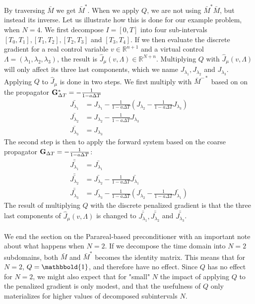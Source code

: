 By traversing $\bar M$ we get $\bar M^*$. When we apply $Q$, we are not using $\bar M^*\bar M$, but instead its inverse. Let us illustrate how this is done for our example problem, when $N=4$. We first decompose $I=[0,T]$ into four sub-intervals $[T_0,T_1], [T_1,T_2], [T_2,T_3]$ and $[T_3,T_4]$. If we then evaluate the discrete gradient for a real control variable $v\in\mathbb{R}^{n+1}$ and a virtual control $\Lambda =(\lambda_1,\lambda_2,\lambda_3)$, the result is $\hat J_{\mu}(v,\Lambda)\in\mathbb{R}^{N+n}$. Multiplying $Q$ with $\hat J_{\mu}(v,\Lambda)$ will only affect its three last components, which we name $J_{\lambda_1},J_{\lambda_2}$ and $J_{\lambda_3}$. Applying $Q$ to $\hat J_{\mu}$ is done in two steps. We first multiply with $\bar M^{-*}$ based on on the propagator $\bold G_{\Delta T}^*= -\frac{1}{1-a\Delta T} $ 
\begin{align*}
\bar{J_{\lambda_1}} &=J_{\lambda_1} -\frac{1}{1-a\Delta T}(J_{\lambda_2} -\frac{1}{1-a\Delta T}J_{\lambda_3})\\
\bar{J_{\lambda_2}} &=J_{\lambda_2} -\frac{1}{1-a\Delta T}J_{\lambda_3}\\
\bar{J_{\lambda_3}} &=J_{\lambda_3} 
\end{align*} 
The second step is then to apply the forward system based on the coarse propagator $\bold G_{\Delta T}= -\frac{1}{1-a\Delta T} $:
\begin{align*}
\bar{\bar{J_{\lambda_1}}}&=\bar{J_{\lambda_1}} \\
\bar{\bar{J_{\lambda_2}}}&=\bar{J_{\lambda_2}}-\frac{1}{1-a\Delta T}\bar{J_{\lambda_1}} \\
\bar{\bar{J_{\lambda_3}}}&=\bar{J_{\lambda_3}} -\frac{1}{1-a\Delta T}(\bar{J_{\lambda_2}}-\frac{1}{1-a\Delta T}\bar{J_{\lambda_1}})
\end{align*} 
The result of multiplying $Q$ with the discrete penalized gradient is that the three last components of $\hat J_{\mu}(v,\Lambda)$ is changed to $\bar{\bar{J_{\lambda_1}}},\bar{\bar{J_{\lambda_2}}}$ and $\bar{\bar{J_{\lambda_3}}}$. 
\\
\\
We end the section on the Parareal-based preconditioner with an important note about what happens when $N=2$. If we decompose the time domain into $N=2$ subdomains, both $\bar M$ and $\bar M^*$ becomes the identity matrix. This means that for $N=2$, $Q=\mathbbold{1}$, and therefore have no effect. Since $Q$ has no effect for $N=2$, we might also expect that for "small" $N$ the impact of applying $Q$ to the penalized gradient is only modest, and that the usefulness of $Q$ only materializes for higher values of decomposed subintervals $N$.

